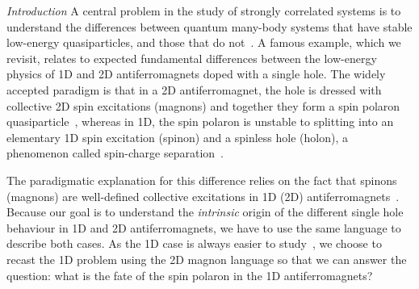 \documentclass[%
 reprint,
 amsmath,amssymb,
 aps,
prl,
]{revtex4-1}
\begin{document}
{\it Introduction}  A central problem in the study of strongly correlated systems  is to understand the differences between quantum many-body systems that have stable low-energy quasiparticles, and those that do not~\cite{Khomskii2010, Zaanen2019, Kumar2021, Lauchli2004, Ver19}. A famous example, which we revisit, relates to expected fundamental differences between the low-energy physics of 1D and 2D antiferromagnets doped with a single hole. The widely accepted paradigm is that in a 2D antiferromagnet, the hole is dressed with collective 2D spin excitations (magnons) and together they form a spin polaron quasiparticle~\cite{Bul68, Sch88, Mar91, Gru18, Chi18, Koepsell2019, Koepsell2021, Wang2021, Bohrdt2021_01}, whereas in 1D, the spin polaron is unstable to splitting into an elementary 1D spin excitation (spinon) and a spinless hole (holon), a phenomenon called  spin-charge separation~\cite{Lieb1968, Voi95, Kim96, Kim1997, Fujisawa1999, Poilblanc2006, Koitzsch2006, Kim06, Jayadev2020}. 

The paradigmatic explanation for this difference  relies on the fact that spinons (magnons) are well-defined collective excitations in 1D (2D) antiferromagnets~\cite{Khomskii2010}. Because our goal is to understand the \textit{intrinsic} origin of the different single hole behaviour in 1D and 2D antiferromagnets, we have to use the same language to describe both cases. As the 1D case is always easier to study~\cite{Giamarchi2003}, we choose to recast the 1D problem using the 2D magnon language so that we can answer the question: what is the fate of the spin polaron in the 1D antiferromagnets?
\end{document}
